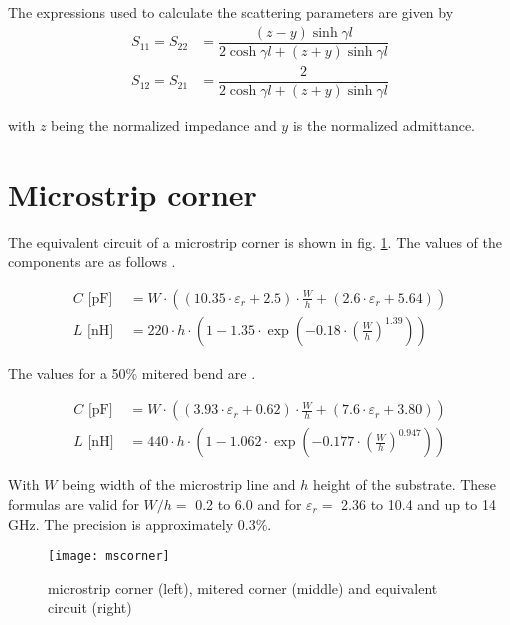 The expressions used to calculate the scattering parameters are given
by
\begin{align}
S_{11} = S_{22} &= \dfrac{\left(z - y\right) \sinh{\gamma l}}{2\cosh{\gamma l} + \left(z + y\right) \sinh{\gamma l}}\\
S_{12} = S_{21} &= \dfrac{2}{2\cosh{\gamma l} + \left(z + y\right) \sinh{\gamma l}}
\end{align}

with $z$ being the normalized impedance and $y$ is the normalized
admittance.

\section{Microstrip corner}

The equivalent circuit of a microstrip corner is shown in fig.
\ref{fig:MScorner}.  The values of the components are as follows
\cite{Kirschning4}.

\begin{align}
C \text{ [pF] } &= W \cdot \left( (10.35\cdot\varepsilon_r + 2.5) \cdot \frac{W}{h} +
			       (2.6\cdot\varepsilon_r + 5.64) \right)\\
L \text{ [nH] } &= 220\cdot h \cdot \left( 1 - 1.35\cdot\exp\left( -0.18\cdot
		   \left( \frac{W}{h} \right)^{1.39} \right) \right)
\end{align}

The values for a 50\% mitered bend are \cite{Kirschning4}.

\begin{align}
C \text{ [pF] } &= W \cdot \left( (3.93\cdot\varepsilon_r + 0.62) \cdot \frac{W}{h} +
			       (7.6\cdot\varepsilon_r + 3.80) \right)\\
L \text{ [nH]} &= 440\cdot h \cdot \left( 1 - 1.062\cdot\exp\left( -0.177\cdot
		   \left( \frac{W}{h} \right)^{0.947} \right) \right)
\end{align}

With $W$ being width of the microstrip line and $h$ height of the
substrate.  These formulas are valid for $W/h = $ 0.2 to 6.0 and for
$\varepsilon_r = $ 2.36 to 10.4 and up to 14 GHz. The precision is
approximately 0.3\%.

\begin{figure}[ht]
\begin{center}
\texttt{[image: mscorner]}
\end{center}
\caption{microstrip corner (left), mitered corner (middle) and equivalent circuit (right)}
\label{fig:MScorner}
\end{figure}
\FloatBarrier

